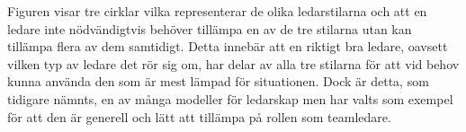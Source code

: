 \noindent Figuren visar tre cirklar vilka representerar de olika ledarstilarna och att en ledare inte nödvändigtvis behöver tillämpa en av de tre stilarna utan kan tillämpa flera av dem samtidigt. Detta innebär att en riktigt bra ledare, oavsett vilken typ av ledare det rör sig om, har delar av alla tre stilarna för att vid behov kunna använda den som är mest lämpad för situationen. Dock är detta, som tidigare nämnts, en av många modeller för ledarskap men har valts som exempel för att den är generell och lätt att tillämpa på rollen som teamledare.